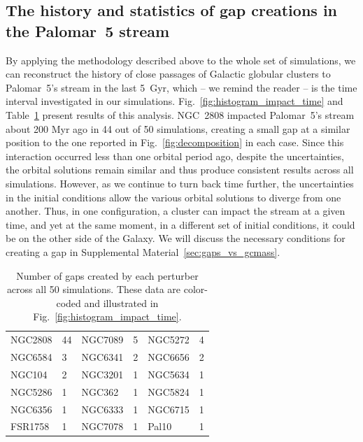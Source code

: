     \subsection{The history and statistics of gap creations in the Palomar~5 stream}\label{sect:history}
        By applying the methodology described above to the whole set of simulations, we can reconstruct the history of close passages of Galactic globular clusters to Palomar~5's stream in the last 5~Gyr, which -- we remind the reader -- is the time interval investigated in our simulations.  Fig.~\ref{fig:histogram_impact_time} and Table~\ref{tab:gaps_per_perturber} present results of this analysis. NGC~2808 impacted Palomar~5's stream about 200 Myr ago in 44 out of 50 simulations, creating a small gap at a similar position to the one reported in Fig.~\ref{fig:decomposition} in each case. Since this interaction occurred less than one orbital period ago, despite the uncertainties, the orbital solutions remain similar and thus produce consistent results across all simulations. However, as we continue to turn back time further, the uncertainties in the initial conditions allow the various orbital solutions to diverge from one another. Thus, in one configuration, a cluster can impact the stream at a given time, and yet at the same moment, in a different set of initial conditions, it could be on the other side of the Galaxy. We will discuss the necessary conditions for creating a gap in Supplemental Material~\ref{sec:gaps_vs_gcmass}. 
        \begin{table}[h]
            \centering
            \caption[Number of gaps created by each perturber across all 50 simulations]{Number of gaps created by each perturber across all 50 simulations. These data are color-coded and illustrated in Fig.~\ref{fig:histogram_impact_time}.}
            \label{tab:gaps_per_perturber}
            \begin{tabular}{|ll|ll|ll|}
            \hline
            NGC2808 & 44 & NGC7089 & 5 & NGC5272 & 4 \\
            NGC6584 & 3 & NGC6341 & 2 & NGC6656 & 2 \\
            NGC104 & 2 & NGC3201 & 1 & NGC5634 & 1 \\
            NGC5286 & 1 & NGC362 & 1 & NGC5824 & 1 \\
            NGC6356 & 1 & NGC6333 & 1 & NGC6715 & 1 \\
            FSR1758 & 1 & NGC7078 & 1 & Pal10 & 1 \\
            \hline
            \end{tabular}
        \end{table} 

